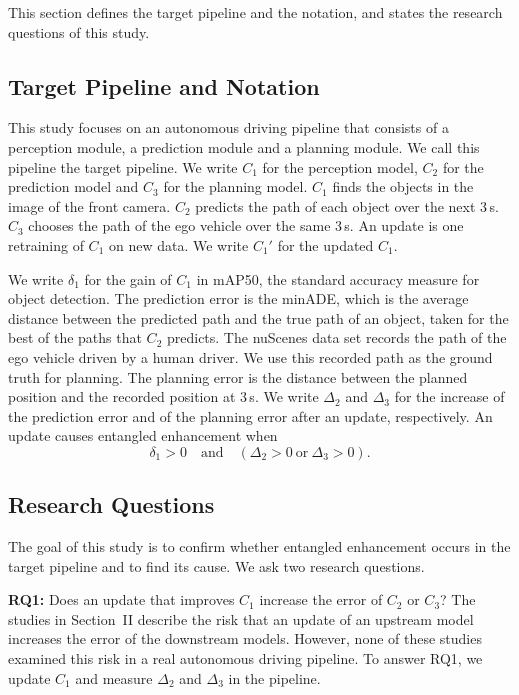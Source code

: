 \documentclass[conference]{IEEEtran}
\begin{document}
This section defines the target pipeline and the notation, and states the research questions of this study.

\subsection{Target Pipeline and Notation}
This study focuses on an autonomous driving pipeline that consists of a perception module, a prediction module and a planning module. We call this pipeline the target pipeline. We write $C_1$ for the perception model, $C_2$ for the prediction model and $C_3$ for the planning model. $C_1$ finds the objects in the image of the front camera. $C_2$ predicts the path of each object over the next 3\,s. $C_3$ chooses the path of the ego vehicle over the same 3\,s. An update is one retraining of $C_1$ on new data. We write $C_1'$ for the updated $C_1$.

We write $\delta_1$ for the gain of $C_1$ in mAP50, the standard accuracy
measure for object detection. The prediction error is the minADE, which is the
average distance between the predicted path and the true path of an object,
taken for the best of the paths that $C_2$ predicts. The nuScenes data set records the path of the ego vehicle driven by a human driver. We use this recorded path as the ground truth for planning. The planning error is the
distance between the planned position and the recorded position at
3\,s. We write $\Delta_2$ and $\Delta_3$ for the increase of the prediction
error and of the planning error after an update, respectively. An update causes entangled
enhancement when
\begin{equation}
\delta_1 > 0 \quad \text{and} \quad (\Delta_2 > 0 \ \text{or} \ \Delta_3 > 0).
\label{eq:ee}
\end{equation}

\subsection{Research Questions}
The goal of this study is to confirm whether entangled enhancement occurs in the target pipeline and to find its cause. We ask two research questions.

\noindent\textbf{RQ1:} Does an update that improves $C_1$ increase the error of $C_2$ or $C_3$? The studies in Section~II describe the risk that an update of an upstream model increases the error of the downstream models. However, none of these studies examined this risk in a real autonomous driving pipeline. To answer RQ1, we update $C_1$ and measure $\Delta_2$ and $\Delta_3$ in the pipeline.
\end{document}
